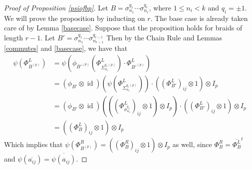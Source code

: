 \documentclass[11pt]{amsart}
\def\s{{\sigma}}
\newcommand\id{\operatorname{id}}
\begin{document}
\begin{proof} [Proof of Proposition \ref{psiofbp}]
Let $B = \s_{n_1}^{q_1}\cdots\s_{n_r}^{q_r}$, where $1\le n_i<k$ and $q_i = \pm 1$.  We will prove the proposition by inducting on $r$.  The base case is already taken care of by Lemma \ref{basecase}.  Suppose that the proposition holds for braids of length $r-1$.  Let $B' =\s_{n_1}^{q_1}\cdots\s_{n_{r-1}}^{q_{r-1}}$ Then by the Chain Rule and Lemmas \ref{commutes} and \ref{basecase}, we have that
\begin{align*}
\psi\left(\Phi_{B^{(p)}}^L\right) &= \psi\left(\phi_{B'^{(p)}}\left(\Phi_{\Sigma^{q_r(p)}_{n_r}}^L\right)\cdot\Phi_{B'^{(p)}}^L\right)\\
&= \left(\phi_{B'}\otimes\id\right)\left(\psi\left(\Phi_{\Sigma^{q_r(p)}_{n_r}}^L\right)\right)\cdot \left(\left(\Phi_{B'}^L\right)_{ij}\otimes 1\right)\otimes I_p\\
&= \left(\phi_{B'}\otimes\id\right)\left(\left(\left(\Phi_{\s_{n_r}^{q_r}}^L\right)_{ij}\otimes 1\right)\otimes I_p\right)\cdot \left(\left(\Phi_{B'}^L\right)_{ij}\otimes 1\right)\otimes I_p\\
&= \left(\left(\Phi_{B}^L\right)_{ij}\otimes 1\right)\otimes I_p
\end{align*}
Which implies that $\psi\left(\Phi_{B^{(p)}}^R\right) = \left(\left(\Phi_{B}^R\right)_{ij}\otimes 1\right)\otimes I_p$ as well, since $\Phi_B^R = \overline{\Phi_B^L}^t$ and $\psi(\overline{a_{ij}}) = \overline{\psi(a_{ij})}$.
\end{proof}
\end{document}
